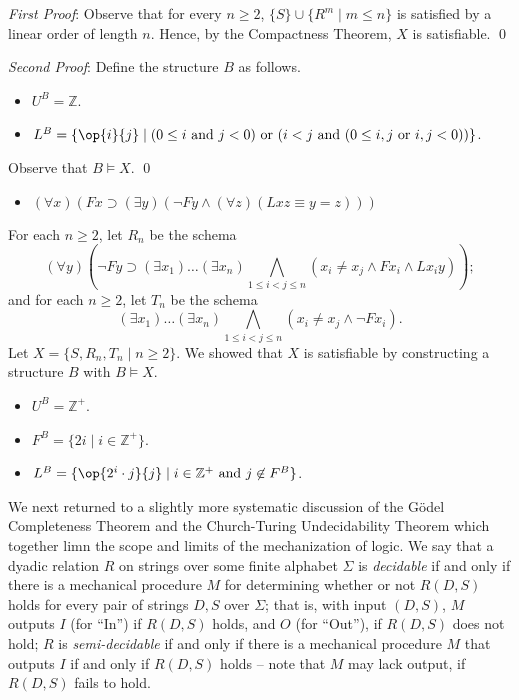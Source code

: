 \emph{First Proof}:
Observe that for every $n\geq 2$, $\{S\}\cup \{R^m\mid m\leq n\}$ is satisfied by a linear order of length $n$. Hence, by the Compactness Theorem, $X$ is satisfiable. \qed

\emph{Second Proof}: Define the structure $B$ as follows.
\begin{itemize}
\item
$U^B=  \mathbb{Z}$.
\item
$L^B=\{\op{i}{j}\mid (0\leq i\mbox{ and } j<0)\mbox{ or }(i<j \mbox{ and }  (0\leq i,j\mbox{ or } i,j<0))\}$.
\end{itemize}
Observe that $B\models X$. \qed

\begin{itemize}
\item $(\forall x)(Fx\supset(\exists y)(\neg Fy\wedge(\forall z)(Lxz\equiv y=z)))$
\end{itemize}
For each $n\geq 2$, let $R_n$ be the schema
\[
(\forall y)(\neg Fy\supset(\exists x_1)\ldots(\exists x_n)\bigwedge_{1\leq i<j\leq n}(x_i\neq x_j\wedge Fx_i\wedge Lx_iy));
\]
and for each $n\geq 2$, let $T_n$ be the schema
\[
(\exists x_1)\ldots(\exists x_n)\bigwedge_{1\leq i<j\leq n}(x_i\neq x_j\wedge \neg Fx_i).
\]
Let $X=\{S,R_n,T_n\mid n\geq 2\}$. We showed that $X$ is satisfiable by constructing a structure $B$ with $B\models X$.
\begin{itemize}
\item
$U^B= \mathbb{Z}^+$.
\item
$F^B=\{2i\mid i\in\mathbb{Z}^+\}$.
\item
$L^B = \{\op{2^i\cdot j}{j}\mid i\in\mathbb{Z}^+\mbox{ and } j\not\in F^B\}$.
\end{itemize}

We next returned to a slightly more systematic discussion of the G\"{o}del Completeness Theorem and the Church-Turing Undecidability Theorem which together limn the scope and limits of the mechanization of logic. We say that a dyadic relation $R$ on strings over some finite alphabet $\Sigma$ is \emph{decidable} if and only if there is a mechanical procedure $M$ for determining whether or not $R(D,S)$ holds for every pair of strings $D,S$ over $\Sigma$; that is, with input $(D,S)$, $M$ outputs $I$ (for ``In'') if $R(D,S)$ holds, and $O$ (for ``Out''), if $R(D,S)$ does not hold; $R$ is \emph{semi-decidable} if and only if there is a mechanical procedure $M$ that outputs $I$ if and only if $R(D,S)$ holds -- note that $M$ may lack output, if $R(D,S)$ fails to hold.  
\fi
